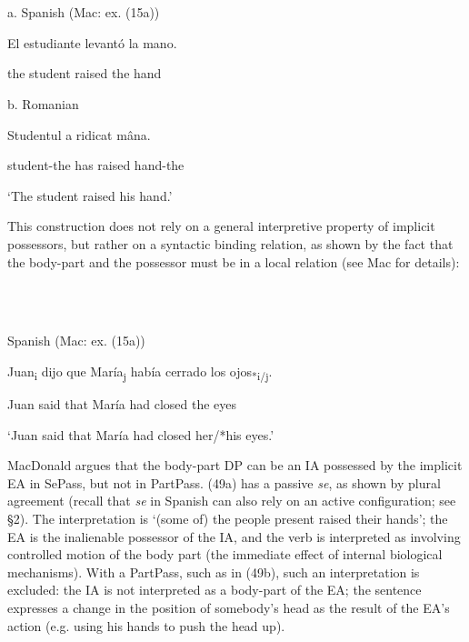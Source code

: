 \documentclass[output=paper]{langsci/langscibook}
\begin{document}
\ea%
    \label{ex:key:47}
    \gll\\
        \\
    \glt
    \z

          a.   Spanish (Mac\citealt{Donald2017}: ex. (15a))

El  estudiante levantó la mano.   

      the student     raised   the hand              

  b.   Romanian

Studentul   a    ridicat mâna.  

      student-the has raised hand-the

‘The student raised his hand.’

This construction does not rely on a general interpretive property of implicit possessors, but rather on a syntactic binding relation, as shown by the fact that the body-part and the possessor must be in a local relation (see Mac\citealt{Donald2017} for details):

\ea%
    \label{ex:key:48}
    \gll\\
        \\
    \glt
    \z

          Spanish (Mac\citealt{Donald2017}: ex. (15a))

Juan\textsubscript{i} dijo que María\textsubscript{j} había cerrado los ojos\textsubscript{*i/j}.   

            Juan said that María  had    closed   the eyes      

‘Juan said that María had closed her/*his eyes.’ 

MacDonald argues that the body-part DP can be an IA possessed by the implicit EA in SePass, but not in PartPass. (49a) has a passive \textit{se}, as shown by plural agreement (recall that \textit{se} in Spanish can also rely on an active configuration; see §2). The interpretation is ‘(some of) the people present raised their hands’; the EA is the inalienable possessor of the IA, and the verb is interpreted as involving controlled motion of the body part (the immediate effect of internal biological mechanisms). With a PartPass, such as in (49b), such an interpretation is excluded: the IA is not interpreted as a body-part of the EA; the sentence expresses a change in the position of somebody’s head as the result of the EA’s action (e.g. using his hands to push the head up).   

\ea%
    \label{ex:key:49}
    \gll\\
        \\
    \glt
    \z
\end{document}
